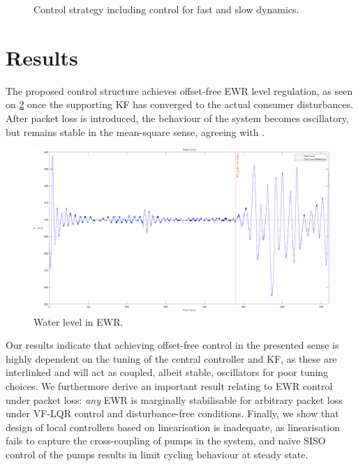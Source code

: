 \documentclass[conference]{IEEEtran}
\begin{document}
		\begin{figure}[h]
			\centering
			\resizebox{0.75\columnwidth}{!}{
				}
			\caption{Control strategy including control for fast and slow dynamics.}
			\label{fig:tikzControlStrat}
		\end{figure}
		
		\section{Results}\label{sec:Results}
		
		The proposed control structure achieves offset-free EWR level regulation, as seen on \cref{fig:OuterLoop} once the supporting KF has converged to the actual consumer disturbances. After packet loss is introduced, the behaviour of the system becomes oscillatory, but remains stable in the mean-square sense, agreeing with \cite{Hu2007}.
		
		\begin{figure}[h!]
			\centering
			\includegraphics[width=1\linewidth]{Graphics/OuterLoop.pdf}
			\caption{Water level in EWR.}
			\label{fig:OuterLoop}
		\end{figure}
	
		Our results indicate that achieving offset-free control in the presented sense is highly dependent on the tuning of the central controller and KF, as these are interlinked and will act as coupled, albeit stable, oscillators for poor tuning choices. We furthermore derive an important result relating to EWR control under packet loss: \textit{any} EWR is marginally stabilisable for arbitrary packet loss under VF-LQR control and disturbance-free conditions. Finally, we show that design of local controllers based on linearisation is inadequate, as linearisation fails to capture the cross-coupling of pumps in the system, and naïve SISO control of the pumps results in limit cycling behaviour at steady state.
		
\end{document}
